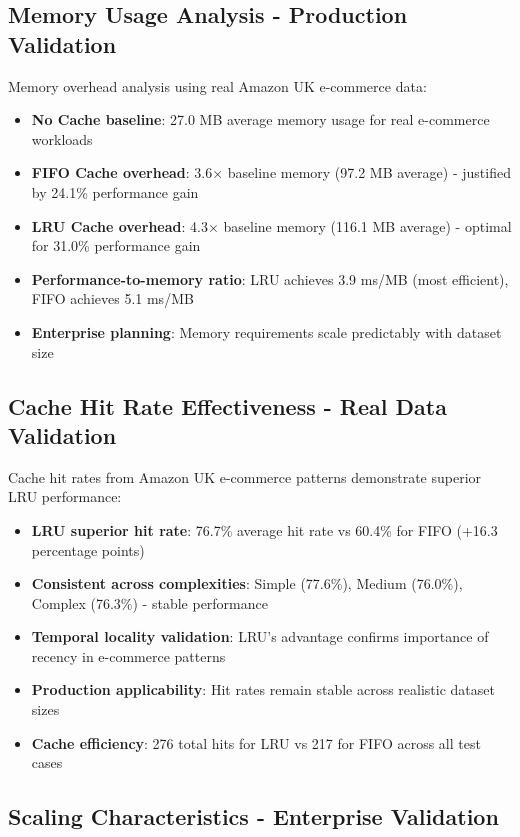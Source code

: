 \documentclass{article}
\begin{document}
\subsection{Memory Usage Analysis - Production Validation}

Memory overhead analysis using real Amazon UK e-commerce data:

\begin{itemize}
    \item \textbf{No Cache baseline}: 27.0 MB average memory usage for real e-commerce workloads
    \item \textbf{FIFO Cache overhead}: 3.6× baseline memory (97.2 MB average) - justified by 24.1\% performance gain
    \item \textbf{LRU Cache overhead}: 4.3× baseline memory (116.1 MB average) - optimal for 31.0\% performance gain
    \item \textbf{Performance-to-memory ratio}: LRU achieves 3.9 ms/MB (most efficient), FIFO achieves 5.1 ms/MB
    \item \textbf{Enterprise planning}: Memory requirements scale predictably with dataset size
\end{itemize}

\subsection{Cache Hit Rate Effectiveness - Real Data Validation}

Cache hit rates from Amazon UK e-commerce patterns demonstrate superior LRU performance:

\begin{itemize}
    \item \textbf{LRU superior hit rate}: 76.7\% average hit rate vs 60.4\% for FIFO (+16.3 percentage points)
    \item \textbf{Consistent across complexities}: Simple (77.6\%), Medium (76.0\%), Complex (76.3\%) - stable performance
    \item \textbf{Temporal locality validation}: LRU's advantage confirms importance of recency in e-commerce patterns
    \item \textbf{Production applicability}: Hit rates remain stable across realistic dataset sizes
    \item \textbf{Cache efficiency}: 276 total hits for LRU vs 217 for FIFO across all test cases
\end{itemize}

\subsection{Scaling Characteristics - Enterprise Validation}
\end{document}
